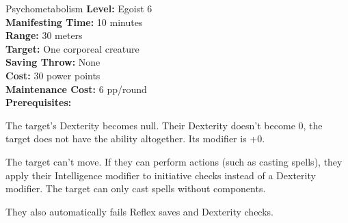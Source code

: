 {Psychometabolism}
{
    \textbf{Level:}
    Egoist 6\\
    \textbf{Manifesting Time:}
    10 minutes\\
    \textbf{Range:}
    30 meters\\
    \textbf{Target:}
    One corporeal creature\\
    \textbf{Saving Throw:}
    None\\
    \textbf{Cost:}
    30 power points\\
    \textbf{Maintenance Cost:}
    6 pp/round\\
    \textbf{Prerequisites:}
    \\
}
{
    The target's Dexterity becomes null. Their Dexterity doesn't become 0, the target does not have the ability altogether. Its modifier is +0.

    The target can't move. If they can perform actions (such as casting spells), they apply their Intelligence modifier to initiative checks instead of a Dexterity modifier. The target can only cast spells without components.

    They also automatically fails Reflex saves and Dexterity checks.
}

